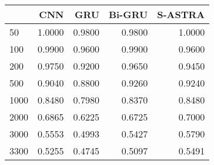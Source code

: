 \begin{tabular}{lrrrr}
\toprule
{} &  \textbf{CNN} &  \textbf{GRU} &  \textbf{Bi-GRU} &  \textbf{S-ASTRA} \\
\midrule
50   &        1.0000 &        0.9800 &           0.9800 &            1.0000 \\
100  &        0.9900 &        0.9600 &           0.9900 &            0.9600 \\
200  &        0.9750 &        0.9200 &           0.9650 &            0.9450 \\
500  &        0.9040 &        0.8800 &           0.9260 &            0.9240 \\
1000 &        0.8480 &        0.7980 &           0.8370 &            0.8480 \\
2000 &        0.6865 &        0.6225 &           0.6725 &            0.7000 \\
3000 &        0.5553 &        0.4993 &           0.5427 &            0.5790 \\
3300 &        0.5255 &        0.4745 &           0.5097 &            0.5491 \\
\bottomrule
\end{tabular}
